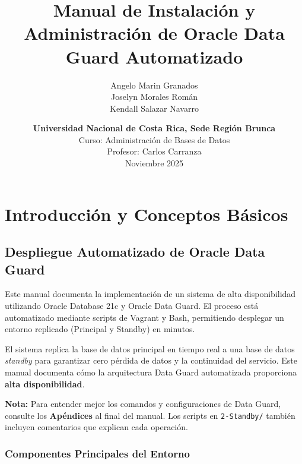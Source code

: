 \documentclass[11pt, a4paper]{report}
\title{\textbf{Manual de Instalación y Administración de Oracle Data Guard Automatizado}}
\author{
    Angelo Marin Granados\\
    Joselyn Morales Román\\
    Kendall Salazar Navarro
}
\date{
    \textbf{Universidad Nacional de Costa Rica, Sede Región Brunca} \\
    \vspace{0.5em}
    Curso: Administración de Bases de Datos \\
    Profesor: Carlos Carranza \\
    \vspace{0.5em}
    Noviembre 2025
}
\begin{document}
\maketitle
\tableofcontents
\newpage


\chapter{Introducción y Conceptos Básicos}

\section{Despliegue Automatizado de Oracle Data Guard}

Este manual documenta la implementación de un sistema de alta disponibilidad utilizando Oracle Database 21c y Oracle Data Guard. El proceso está automatizado mediante scripts de Vagrant y Bash, permitiendo desplegar un entorno replicado (Principal y Standby) en minutos.

El sistema replica la base de datos principal en tiempo real a una base de datos \textit{standby} para garantizar cero pérdida de datos y la continuidad del servicio. Este manual documenta cómo la arquitectura Data Guard automatizada proporciona \textbf{alta disponibilidad}.

\vspace{0.5em}
\noindent\textbf{Nota:} Para entender mejor los comandos y configuraciones de Data Guard, consulte los \textbf{Apéndices} al final del manual. Los scripts en \texttt{2-Standby/} también incluyen comentarios que explican cada operación.

\subsection{Componentes Principales del Entorno}
\end{document}
